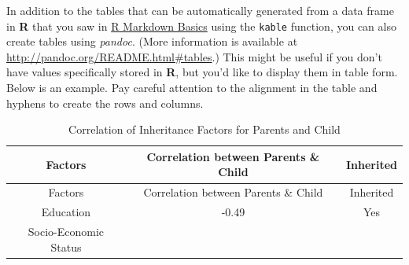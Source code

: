 \documentclass [11pt, proquest] {uwthesis}[2015/03/03]
\begin{document}
In addition to the tables that can be automatically generated from a
data frame in \textbf{R} that you saw in
\protect\hyperlink{rmd-basics}{R Markdown Basics} using the
\texttt{kable} function, you can also create tables using \emph{pandoc}.
(More information is available at
\url{http://pandoc.org/README.html\#tables}.) This might be useful if
you don't have values specifically stored in \textbf{R}, but you'd like
to display them in table form. Below is an example. Pay careful
attention to the alignment in the table and hyphens to create the rows
and columns.
\begin{longtable}[]{@{}ccc@{}}
\caption{\label{tab:inher} Correlation of Inheritance Factors for Parents
and Child}\tabularnewline
\toprule
\begin{minipage}[b]{0.29\columnwidth}\centering\strut
Factors\strut
\end{minipage} & \begin{minipage}[b]{0.47\columnwidth}\centering\strut
Correlation between Parents \& Child\strut
\end{minipage} & \begin{minipage}[b]{0.16\columnwidth}\centering\strut
Inherited\strut
\end{minipage}\tabularnewline
\midrule
\endfirsthead
\toprule
\begin{minipage}[b]{0.29\columnwidth}\centering\strut
Factors\strut
\end{minipage} & \begin{minipage}[b]{0.47\columnwidth}\centering\strut
Correlation between Parents \& Child\strut
\end{minipage} & \begin{minipage}[b]{0.16\columnwidth}\centering\strut
Inherited\strut
\end{minipage}\tabularnewline
\midrule
\endhead
\begin{minipage}[t]{0.29\columnwidth}\centering\strut
Education\strut
\end{minipage} & \begin{minipage}[t]{0.47\columnwidth}\centering\strut
-0.49\strut
\end{minipage} & \begin{minipage}[t]{0.16\columnwidth}\centering\strut
Yes\strut
\end{minipage}\tabularnewline
\begin{minipage}[t]{0.29\columnwidth}\centering\strut
Socio-Economic Status\strut
\end{minipage} & \begin{minipage}[t]{0.47\columnwidth}\centering\strut

\end{minipage}
\end{longtable}
\end{document}
